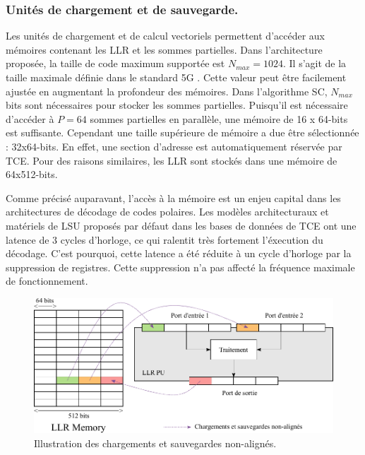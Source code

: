 \subsubsection{Unités de chargement et de sauvegarde.}



Les unités de chargement et de calcul vectoriels permettent d'accéder aux mémoires contenant les LLR et les sommes partielles. Dans l'architecture proposée, la taille de code maximum supportée est $N_{max}=1024$. Il s'agit de la taille maximale définie dans le standard 5G \cite{3gpp_ts_2017}. Cette valeur peut être facilement ajustée en augmentant la profondeur des mémoires. Dans l'algorithme SC, $N_{max}$ bits sont nécessaires pour stocker les sommes partielles. Puisqu'il est nécessaire d'accéder à $P=64$ sommes partielles en parallèle, une mémoire de 16 x 64-bits est suffisante. Cependant une taille supérieure de mémoire a due être sélectionnée : 32x64-bits. En effet, une section d'adresse est automatiquement réservée par TCE. Pour des raisons similaires, les LLR sont stockés dans une mémoire de 64x512-bits.

Comme précisé auparavant, l'accès à la mémoire est un enjeu capital dans les architectures de décodage de codes polaires. Les modèles architecturaux et matériels de LSU proposés par défaut dans les bases de données de TCE ont une latence de 3 cycles d'horloge, ce qui ralentit très fortement l'éxecution du décodage. C'est pourquoi, cette latence a été réduite à un cycle d'horloge par la suppression de registres. Cette suppression n'a pas affecté la fréquence maximale de fonctionnement.
\begin{figure}[htp]
	\centering
	\includegraphics[width=\textwidth]{main/ch4_fig/unaligned}
	\caption{Illustration des chargements et sauvegardes non-alignés.}
	\label{fig:unaligned}
\end{figure}

